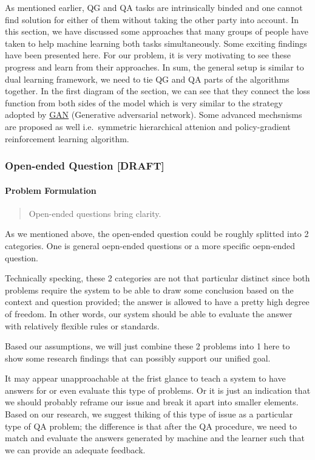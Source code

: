 \documentclass[]{book}
\let\oldparagraph\paragraph
\renewcommand{\paragraph}[1]{\oldparagraph{#1}\mbox{}}
\theoremstyle{definition}
\theoremstyle{definition}
\theoremstyle{definition}
\theoremstyle{remark}
\begin{document}
As mentioned earlier, QG and QA tasks are intrinsically binded and one
cannot find solution for either of them without taking the other party
into account. In this section, we have discussed some approaches that
many groups of people have taken to help machine learning both tasks
simultaneously. Some exciting findings have been presented here. For our
problem, it is very motivating to see these progress and learn from
their approaches. In sum, the general setup is similar to dual learning
framework, we need to tie QG and QA parts of the algorithms together. In
the first diagram of the section, we can see that they connect the loss
function from both sides of the model which is very similar to the
strategy adopted by
\href{https://en.wikipedia.org/wiki/Generative_adversarial_network}{GAN}
(Generative adversarial network). Some advanced mechsnisms are proposed
as well i.e.~symmetric hierarchical attenion and policy-gradient
reinforcement learning algorithm.

\subsubsection{Open-ended Question
{[}DRAFT{]}}\label{open-ended-question-draft}

\paragraph{Problem Formulation}\label{problem-formulation-1}

\begin{quote}
Open-ended questions bring clarity.
\end{quote}

As we mentioned above, the open-ended question could be roughly splitted
into 2 categories. One is general oepn-ended questions or a more
specific oepn-ended question.

Technically specking, these 2 categories are not that particular
distinct since both problems require the system to be able to draw some
conclusion based on the context and question provided; the answer is
allowed to have a pretty high degree of freedom. In other words, our
system should be able to evaluate the answer with relatively flexible
rules or standards.

Based our assumptions, we will just combine these 2 problems into 1 here
to show some research findings that can possibly support our unified
goal.

It may appear unapproachable at the frist glance to teach a system to
have answers for or even evaluate this type of problems. Or it is just
an indication that we should probably reframe our issue and break it
apart into smaller elements. Based on our research, we suggest thiking
of this type of issue as a particular type of QA problem; the difference
is that after the QA procedure, we need to match and evaluate the
answers generated by machine and the learner such that we can provide an
adequate feedback.
\end{document}
